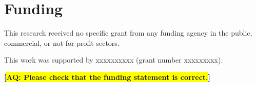 \usepackage{color}
\def\query#1{\textbf{[{\colorbox{yellow}{AQ: {#1}}}]}}
\def\typesetter#1{\textbf{[{\colorbox{cyan}{TYPESETTER: {#1}}}]}}
\def\figmark#1{\textbf{[{\colorbox{yellow}{Please insert Figure {#1} near here}}]}}
\def\tabmark#1{\textbf{[{\colorbox{yellow}{Please insert Table {#1} near here}}]}}
\def\extension#1{\textbf{[{\colorbox{yellow}{Please insert link for Extension~{#1} in the above paragraph}}]}}
\usepackage[hang,flushmargin]{footmisc}
\usepackage{endnotes}
\let\footnote=\endnote
\linespread{2} %
\usepackage[sort]{natbib} %


\renewcommand{\d}{{\,\rm d}} %
\usepackage{times}
\usepackage[format=plain,labelsep=period,labelfont=bf,size=small]{caption}
\usepackage{mathptmx}
\usepackage{txfonts}
\usepackage{fullpage}
\usepackage{varwidth}
\usepackage{xcolor}


\section*{Funding} 

This research received no specific grant from any funding agency in the public,
commercial, or not-for-profit sectors.

This work was supported by xxxxxxxxxx (grant number xxxxxxxxx).

\query{Please check that the funding statement is correct.}


